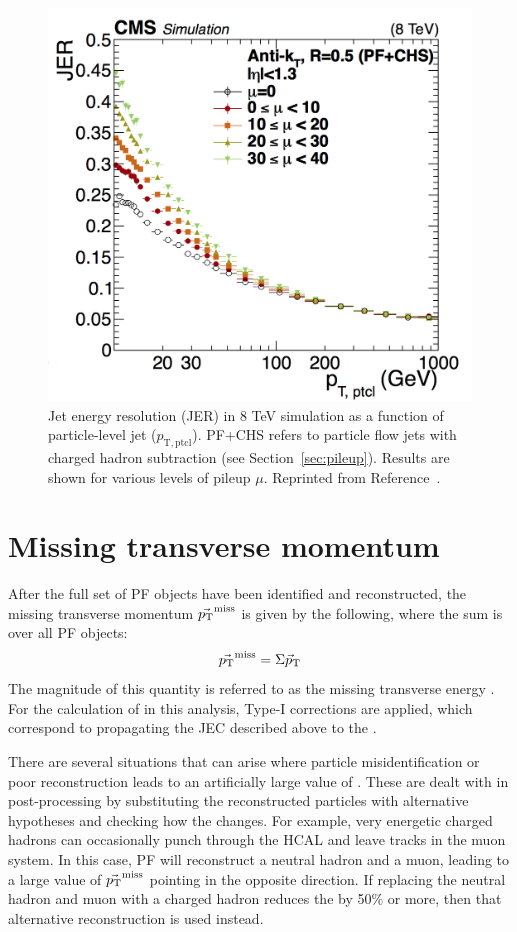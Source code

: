  \begin{figure}[h!]
	\centering
	\includegraphics[width=0.65\linewidth]{Figures/EventReconstruction/JER.png}
       \caption[Jet energy resolution in 8 TeV simulation as a function of particle-level jet \pt.]
       {Jet energy resolution (JER) in 8 TeV simulation as a function of particle-level jet \pt ($p_{\mathrm{T,ptcl}}$). 
       PF+CHS refers to particle flow
       jets with charged hadron subtraction (see Section~\ref{sec:pileup}). Results are shown for various levels of pileup $\mu$. 
       Reprinted from Reference~\cite{JEC}.}
       \label{fig:JER}
\end{figure}


\section{Missing transverse momentum}
\label{sec:MET_Reco}
After the full set of PF objects have been identified and reconstructed, the missing transverse momentum $\vec{p_{\mathrm{T}}}^{\mathrm{miss}}$ is given by the following, where the sum is over all PF objects:
\begin{equation}
\vec{p_{\mathrm{T}}}^{\mathrm{miss}} = \Sigma {\vec p}_{\mathrm{T}}
\end{equation}
The magnitude of this quantity is referred to as the missing transverse energy \ETmiss. For the calculation of \ETmiss in this analysis, Type-I corrections are applied, which correspond to propagating the JEC described above to the \ETmiss. 

There are several situations that can arise where particle misidentification or poor reconstruction leads to an artificially large value of \ETmiss. These are dealt with in post-processing by substituting the reconstructed particles with alternative hypotheses and checking how the \ETmiss changes. For example, very energetic charged hadrons can occasionally punch through the HCAL and leave tracks in the muon system. In this case, PF will reconstruct a neutral hadron and a muon, leading to a large value of $\vec{p_{\mathrm{T}}}^{\mathrm{miss}}$ pointing in the opposite direction. If replacing the neutral hadron and muon with a charged hadron reduces the \ETmiss by 50\% or more, then that alternative reconstruction is used instead.

